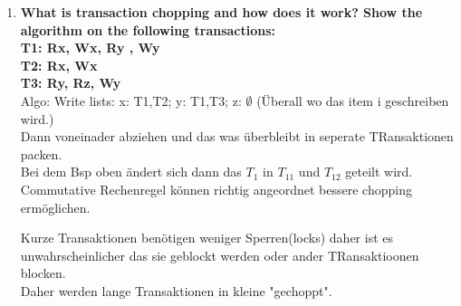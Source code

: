 \documentclass[12pt]{article}\pagestyle{myheadings}
\theoremstyle{plain}
\begin{document}
\begin{enumerate}
\item \textbf{What is transaction chopping and how does it work? Show the algorithm on the following transactions:\\ 
T1: Rx, Wx, Ry , Wy\\
T2: Rx, Wx\\
T3: Ry, Rz, Wy\\
} 
Algo:
Write lists: x: T1,T2; y: T1,T3; z: $\emptyset$ (Überall wo das item i geschreiben wird.)\\
Dann voneinader abziehen und das was überbleibt in seperate TRansaktionen packen.\\
Bei dem Bsp oben ändert sich dann das $T_1$ in $T_{11}$ und $T_{12}$ geteilt wird.\\
Commutative Rechenregel können richtig angeordnet bessere chopping ermöglichen.



Kurze Transaktionen benötigen weniger Sperren(locks) daher ist es unwahrscheinlicher das sie geblockt werden oder ander TRansaktioonen blocken.\\
Daher werden lange Transaktionen in kleine "gechoppt".\\



\end{enumerate}
\end{document}
